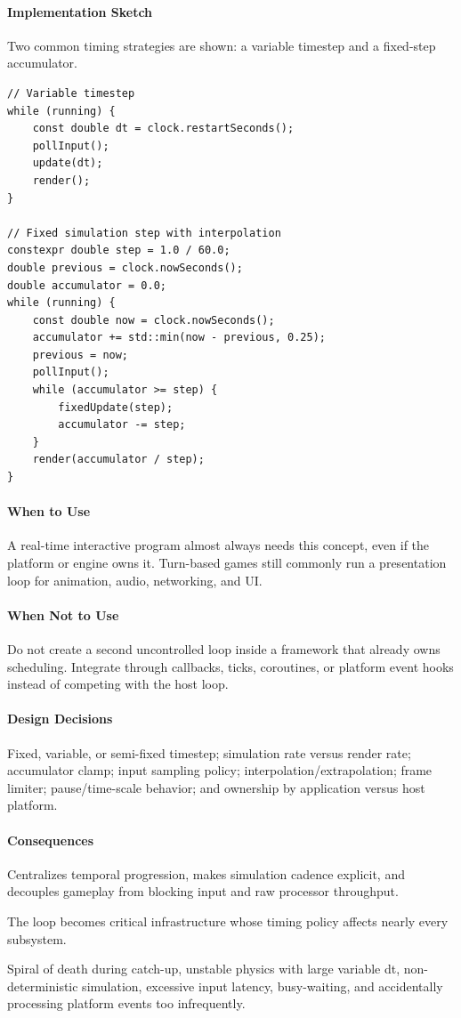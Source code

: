 \documentclass[11pt]{article}
\begin{document}
\paragraph{Implementation Sketch} Two common timing strategies are shown: a variable timestep and a fixed-step accumulator.
\begin{lstlisting}
// Variable timestep
while (running) {
    const double dt = clock.restartSeconds();
    pollInput();
    update(dt);
    render();
}

// Fixed simulation step with interpolation
constexpr double step = 1.0 / 60.0;
double previous = clock.nowSeconds();
double accumulator = 0.0;
while (running) {
    const double now = clock.nowSeconds();
    accumulator += std::min(now - previous, 0.25);
    previous = now;
    pollInput();
    while (accumulator >= step) {
        fixedUpdate(step);
        accumulator -= step;
    }
    render(accumulator / step);
}
\end{lstlisting}
\paragraph{When to Use} A real-time interactive program almost always needs this concept, even if the platform or engine owns it. Turn-based games still commonly run a presentation loop for animation, audio, networking, and UI.
\paragraph{When Not to Use} Do not create a second uncontrolled loop inside a framework that already owns scheduling. Integrate through callbacks, ticks, coroutines, or platform event hooks instead of competing with the host loop.
\paragraph{Design Decisions} Fixed, variable, or semi-fixed timestep; simulation rate versus render rate; accumulator clamp; input sampling policy; interpolation/extrapolation; frame limiter; pause/time-scale behavior; and ownership by application versus host platform.
\paragraph{Consequences}
\begin{description}[leftmargin=2.7cm,style=nextline]
\item[Benefits] Centralizes temporal progression, makes simulation cadence explicit, and decouples gameplay from blocking input and raw processor throughput.
\item[Costs] The loop becomes critical infrastructure whose timing policy affects nearly every subsystem.
\item[Risks] Spiral of death during catch-up, unstable physics with large variable dt, non-deterministic simulation, excessive input latency, busy-waiting, and accidentally processing platform events too infrequently.
\end{description}
\end{document}
